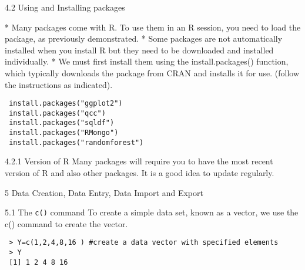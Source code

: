 \documentclass{beamer}
\begin{document}
 
{4.2 Using and Installing packages}
 
 *  Many packages come with R. To use them in an R session, you need to load the package, as
 previously demonstrated.
 *  Some packages are not automatically installed when you install R but they need to be downloaded
 and installed individually. 
 *  We must first install them using the install.packages()
 function, which typically downloads the package from CRAN and installs it for use. (follow the
 instructions as indicated).

 
 
 \begin{framed}
 \begin{verbatim}
 install.packages("ggplot2")
 install.packages("qcc")
 install.packages("sqldf")
 install.packages("RMongo")
 install.packages("randomforest")
 \end{verbatim}
 \end{framed}
 
 
 
{4.2.1 Version of R}
 Many packages will require you to have the most recent version of R and also other packages.
 It is a good idea to update regularly.
 
 
 5 Data Creation, Data Entry, Data Import and Export
 
 
{5.1 The \texttt{c()} command}
 To create a simple data set, known as a vector, we use the c() command to create the vector.
 \begin{framed}
 \begin{verbatim}
 > Y=c(1,2,4,8,16 ) #create a data vector with specified elements
 > Y
 [1] 1 2 4 8 16
 
 \end{verbatim}
 \end{framed}
 
 
 
\end{document}
